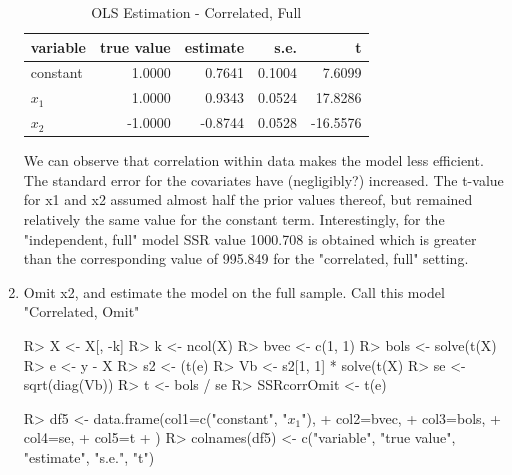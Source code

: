 \documentclass[11pt,reqno]{article}   %
\newcommand{\ksp}{\vspace{0.1in}}   %
\begin{document}
\begin{enumerate}
\begin{table}[!h]
\centering
\caption{OLS Estimation - Correlated, Full} 
\begin{tabular}{lrrrr}
  \hline
variable & true value & estimate & s.e. & t \\ 
  \hline
constant & 1.0000 & 0.7641 & 0.1004 & 7.6099 \\ 
  $x_1$ & 1.0000 & 0.9343 & 0.0524 & 17.8286 \\ 
  $x_2$ & -1.0000 & -0.8744 & 0.0528 & -16.5576 \\ 
   \hline
\end{tabular}
\end{table}
We can observe that correlation within data makes the model less efficient. The standard error for the covariates have (negligibly?) increased. The t-value for x1 and x2 assumed almost half the prior values thereof, but remained relatively the same value for the constant term. Interestingly, for the "independent, full" model SSR value 1000.708 is obtained which is greater than the corresponding value of 995.849 for the "correlated, full" setting.

\ksp 
\item
Omit x2, and estimate the model on the full sample. Call this model "Correlated, Omit"
\begin{Schunk}
\begin{Sinput}
R> X <- X[, -k]
R> k <- ncol(X)
R> bvec <- c(1, 1)
R> bols <- solve(t(X) %
R> e <- y - X %
R> s2 <- (t(e) %
R> Vb <- s2[1, 1] * solve(t(X) %
R> se <- sqrt(diag(Vb))
R> t <- bols / se
R> SSRcorrOmit <- t(e) %
\end{Sinput}
\end{Schunk}

\ksp

\begin{Schunk}
\begin{Sinput}
R> df5 <- data.frame(col1=c("constant", "$x_1$"),
+                  col2=bvec,
+                  col3=bols,
+                  col4=se,
+                  col5=t
+                  )
R> colnames(df5) <- c("variable", "true value", "estimate", "s.e.", "t")
\end{Sinput}
\end{Schunk}


\end{enumerate}
\end{document}

